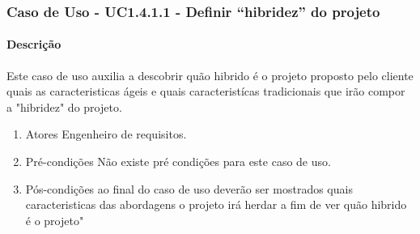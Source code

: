 \subsubsection{Caso de Uso - UC1.4.1.1 - Definir ``hibridez'' do projeto}
\paragraph{Descrição}
Este caso de uso auxilia a descobrir quão hibrido é o projeto proposto pelo cliente quais as caracteristicas ágeis e quais caracteristícas tradicionais que irão compor a "hibridez" do projeto.

\begin{enumerate}
	\item Atores
		Engenheiro de requisitos. 
	\item Pré-condições
		Não existe pré condições para este caso de uso.
	\item Pós-condições
		ao final do caso de uso deverão ser mostrados quais caracteristicas das abordagens o projeto irá herdar a fim de ver quão hibrido é o projeto" 
\end{enumerate}
